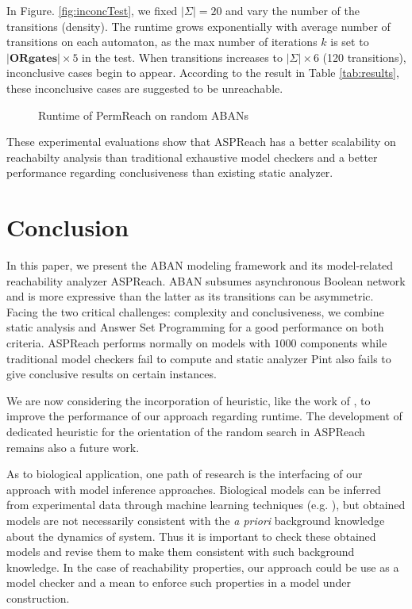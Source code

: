 \documentclass{entcs}
\begin{document}
In Figure. \ref{fig:inconcTest}, we fixed $|\Sigma|=20$ and vary the number of the transitions (density).
The runtime grows exponentially with average number of transitions on each automaton, as the max number of iterations $k$ is set to $|\mathbf{OR gates}|\times5$ in the test.
When transitions increases to $|\Sigma|\times6$ (120 transitions), inconclusive cases begin to appear. According to the result in Table \ref{tab:results}, these inconclusive cases are suggested to be unreachable.

\begin{figure}[ht]
    \caption{Runtime of PermReach on random ABANs}
\end{figure}

These experimental evaluations show that ASPReach has a better scalability on reachabilty analysis than traditional exhaustive model checkers and a better performance regarding conclusiveness than existing static analyzer.

\section{Conclusion}
In this paper, we present the ABAN modeling framework and its model-related reachability analyzer ASPReach.
ABAN subsumes asynchronous Boolean network and is more expressive than the latter as its transitions can be asymmetric. 
Facing the two critical challenges: complexity and conclusiveness, we combine static analysis and Answer Set Programming for a good performance on both criteria.
ASPReach performs normally on models with $1000$ components while traditional model checkers fail to compute and static analyzer Pint also fails to give conclusive results on certain instances.

We are now considering the incorporation of heuristic, like the work of \cite{PRNs-TCS18}, to improve the performance of our approach regarding runtime.
The development of dedicated heuristic for the orientation of the random search in ASPReach remains also a future work.

As to biological application, one path of research is the interfacing of our approach with model inference approaches.
Biological models can be inferred from experimental data through machine learning techniques (e.g. \cite{inoue2014learning}), but obtained models are not necessarily consistent with the \textit{a priori} background knowledge about the dynamics of system. 
Thus it is important to check these obtained models and revise them to make them consistent with such background knowledge.
In the case of reachability properties, our approach could be use as a model checker and a mean to enforce such properties in a model under construction.
\end{document}
